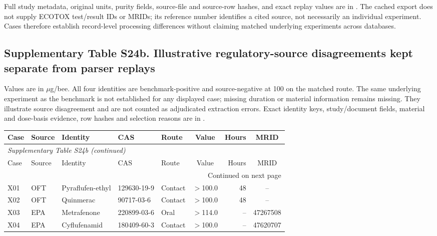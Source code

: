 Full study metadata, original units, purity fields, source-file and source-row hashes, and exact replay values are in . The cached export does not supply ECOTOX test/result IDs or MRIDs; its reference number identifies a cited source, not necessarily an individual experiment. Cases therefore establish record-level processing differences without claiming matched underlying experiments across databases.

\subsection*{Supplementary Table S24b. Illustrative regulatory-source disagreements kept separate from parser replays}

Values are in $\mu$g/bee. All four identities are benchmark-positive and source-negative at 100 on the matched route. The same underlying experiment as the benchmark is not established for any displayed case; missing duration or material information remains missing. They illustrate source disagreement and are not counted as adjudicated extraction errors. Exact identity keys, study/document fields, material and dose-basis evidence, row hashes and selection reasons are in .

\begingroup\footnotesize\setlength{\tabcolsep}{4pt}

\begin{longtable}{lllllcrc}

\toprule Case & Source & Identity & CAS & Route & Value & Hours & MRID \\ \midrule\endfirsthead

\multicolumn{8}{l}{\textit{Supplementary Table S24b (continued)}} \\

\toprule Case & Source & Identity & CAS & Route & Value & Hours & MRID \\ \midrule\endhead

\midrule\multicolumn{8}{r}{Continued on next page}\\\endfoot\bottomrule\endlastfoot

X01 & OFT & Pyraflufen-ethyl & 129630-19-9 & Contact & $>$100.0 & 48 & -- \\

X02 & OFT & Quinmerac & 90717-03-6 & Contact & $>$100.0 & 48 & -- \\

X03 & EPA & Metrafenone & 220899-03-6 & Oral & $>$114.0 & -- & 47267508 \\

X04 & EPA & Cyflufenamid & 180409-60-3 & Contact & $>$100.0 & -- & 47620707 \\

\end{longtable}\endgroup

